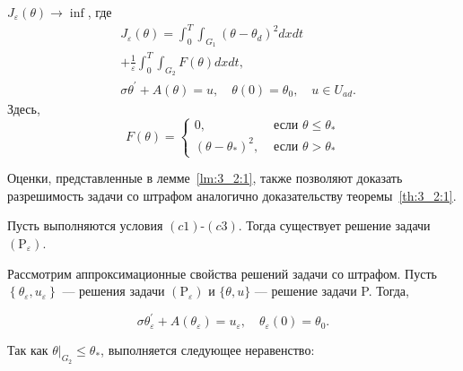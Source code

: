 \begin{definition}
$J_{\varepsilon}(\theta) \rightarrow \inf$, где
\[
    \begin{aligned}
        & J_{\varepsilon}(\theta)=\int_{0}^{T}
        \int_{G_{1}}\left(\theta-\theta_{d}\right)^{2} d x d t \\
        & +\frac{1}{\varepsilon} \int_{0}^{T}
        \int_{G_{2}} F(\theta) d x d t, \\
        & \sigma \theta^{\prime}+A(\theta)=u,
        \quad \theta(0)=\theta_{0}, \quad u \in U_{a d}.
    \end{aligned}
\]
Здесь,
\[
    F(\theta)=
    \begin{cases}
        0, & \text { если } \theta \leq \theta_{*} \\
        \left(\theta-\theta_{*}\right)^{2},
        & \text { если } \theta>\theta_{*}
    \end{cases}
\]
\end{definition}

Оценки, представленные в лемме~\ref{lm:3_2:1}, также позволяют доказать разрешимость
задачи со штрафом аналогично доказательству теоремы~\ref{th:3_2:1}.

\begin{theorem}
    \label{th:3_2:2}
    Пусть выполняются условия $(c1)$-$(c3)$.
    Тогда существует решение задачи $\left(\mathrm{P}_{\varepsilon}\right)$.
\end{theorem}

Рассмотрим аппроксимационные свойства решений задачи со штрафом.
Пусть $\left\{\theta_{\varepsilon}, u_{\varepsilon}\right\}$ — решения задачи
$\left(\mathrm{P}_{\varepsilon}\right)$ и $\{\theta, u\}$ — решение задачи P\@.
Тогда,

\begin{equation}
    \label{eq:3_2:8}
    \sigma \theta_{\varepsilon}^{\prime}
    +A\left(\theta_{\varepsilon}\right)=u_{\varepsilon},
    \quad \theta_{\varepsilon}(0)=\theta_{0}.
\end{equation}

Так как $\left.\theta\right|_{G_{2}} \leq \theta_{*}$, выполняется следующее неравенство:


